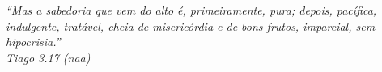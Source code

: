 \begin{epigrafe}
    \vspace*{\fill}
    \begin{flushright}
        \textit{``Mas a sabedoria que vem do alto é, primeiramente, pura; depois, pacífica, indulgente, tratável, cheia de misericórdia e de bons frutos, imparcial, sem hipocrisia.''\\[0.5cm]
        \textemdash{} Tiago 3.17 (\gls{naa})}
    \end{flushright}
\end{epigrafe}
